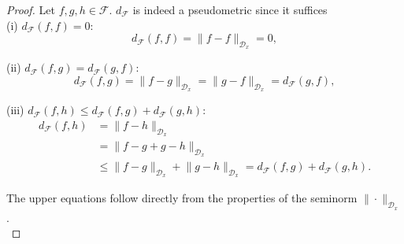 \documentclass[11pt, a4paper]{article}
\newcommand{\D}{\mathcal{D}}
\newcommand{\F}{\mathcal{F}}
\begin{document}
\begin{proof}
Let $f,g,h \in \F$. $d_{\F}$ is indeed a pseudometric since it suffices \\

(i) $d_{\F}(f,f) = 0$:
\[ d_{\F}(f,f) = \big \| f - f \big \|_{\D_x} = 0, \]

(ii) $d_{\F}(f,g) = d_{\F}(g,f)$:
\[ d_{\F}(f,g) = \big \| f - g \big \|_{\D_x} = \big \| g - f \big \|_{\D_x} = d_{\F}(g,f), \]

(iii) $d_{\F}(f,h) \le d_{\F}(f,g) + d_{\F}(g,h)$:
\[ \begin{split} 
d_{\F}(f,h) &= \big \| f - h \big \|_{\D_x} \\\ &= \big \| f - g + g - h \big \|_{\D_x} \\\ &\le \big \| f - g  \big \|_{\D_x} + \big \| g - h \big \|_{\D_x} = d_{\F}(f,g) + d_{\F}(g,h). 
\end{split} \]

The upper equations follow directly from the properties of the seminorm $\| \cdot \|_{\D_x}$. \\


\end{proof}
\end{document}

